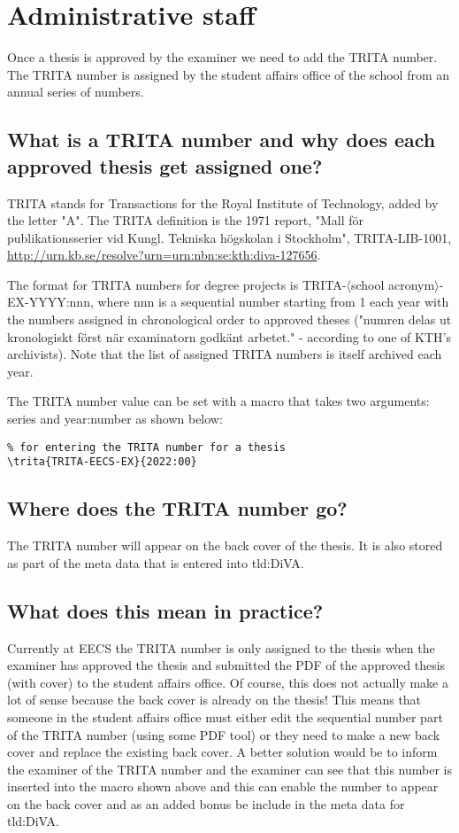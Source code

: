 \section{Administrative staff}
\label{sec:adminStaff}

Once a thesis is approved by the examiner we need to add the TRITA number. The TRITA number is assigned by the student affairs office of the school from an annual series of numbers.

\subsection{What is a TRITA number and why does each approved thesis get assigned one?}

TRITA stands for Transactions for the Royal Institute of Technology, added by the letter "A". The TRITA definition is the 1971 report, "Mall för publikationsserier vid Kungl. Tekniska högskolan i Stockholm", TRITA-LIB-1001, \url{http://urn.kb.se/resolve?urn=urn:nbn:se:kth:diva-127656}.

The format for TRITA numbers for degree projects is TRITA-$\langle$school acronym$\rangle$-EX-YYYY:nnn, where nnn is a sequential number starting from 1 each year with the numbers assigned in chronological order to approved theses ("numren delas ut kronologiskt först när examinatorn godkänt arbetet." - according to one of KTH's archivists). Note that the list of assigned TRITA numbers is itself archived each year.

The TRITA number value can be set with a macro that takes two arguments: series and year:number as shown below:
\begin{lstlisting}
% for entering the TRITA number for a thesis
\trita{TRITA-EECS-EX}{2022:00}  
\end{lstlisting}

\subsection{Where does the TRITA number go?}
The TRITA number will appear on the back cover of the thesis. It is also stored as part of the meta data that is entered into \gls{tld:DiVA}.

\subsection{What does this mean in practice?}
Currently at EECS the TRITA number is only assigned to the thesis when the examiner has approved the thesis and submitted the PDF of the approved thesis (with cover) to the student affairs office. Of course, this does not actually make a lot of sense because the back cover is already on the thesis! This means that someone in the student affairs office must either \first edit the sequential number part of the TRITA number (using some PDF tool) or \Second they need to make a new back cover and replace the existing back cover. A better solution would be to inform the examiner of the TRITA number and the examiner can see that this number is inserted into the macro shown above and this can enable the number to appear on the back cover and as an added bonus be include in the meta data for \gls{tld:DiVA}.

